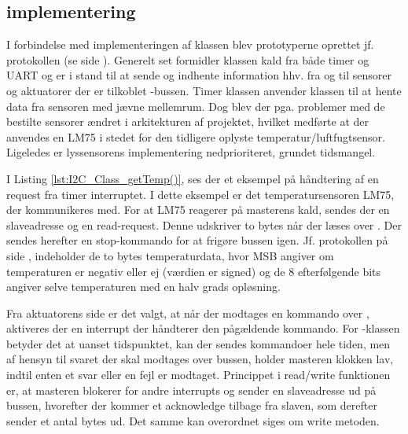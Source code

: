 

\clearpage

\subsection{\IIC implementering} 
I forbindelse med implementeringen af \IIC klassen blev prototyperne oprettet jf. \IIC protokollen (se side \pageref{sec:I2C_protokol}).
Generelt set formidler klassen kald fra både timer og UART og er i stand til at sende og indhente information hhv. fra og til sensorer og aktuatorer der er tilkoblet \IIC-bussen.
Timer klassen anvender \IIC klassen til at hente data fra sensoren med jævne mellemrum.
Dog blev der pga. problemer med de bestilte sensorer ændret i arkitekturen af projektet, hvilket medførte at der anvendes en LM75 i stedet for den tidligere oplyste temperatur/luftfugtsensor.
Ligeledes er lyssensorens implementering nedprioriteret, grundet tidsmangel.



I Listing \ref{lst:I2C_Class_getTemp()}, ses der et eksempel på håndtering af en request fra timer interruptet. 
I dette eksempel er det temperatursensoren LM75, der kommunikeres med. 
For at LM75 reagerer på masterens kald, sendes der en slaveadresse og en read-request. 
Denne udskriver to bytes når der læses over \IIC. 
Der sendes herefter en \IIC stop-kommando for at frigøre bussen igen.
Jf. \IIC protokollen på side \pageref{sec:I2C_protokol}, indeholder de to bytes temperaturdata, hvor MSB angiver om temperaturen er negativ eller ej (værdien er signed) og de 8 efterfølgende bits angiver selve temperaturen med en halv grads opløsning.

Fra aktuatorens side er det valgt, at når der modtages en kommando over \IIC, aktiveres der en interrupt der håndterer den pågældende kommando. 
For \IIC-klassen betyder det at uanset tidspunktet, kan der sendes kommandoer hele tiden, men af hensyn til svaret der skal modtages over bussen, holder masteren klokken lav, indtil enten et svar eller en fejl er modtaget. 
Princippet i read/write funktionen er, at masteren blokerer for andre interrupts og sender en slaveadresse ud på bussen, hvorefter der kommer et acknowledge tilbage fra slaven, som derefter sender et antal bytes ud. 
Det samme kan overordnet siges om write metoden.

